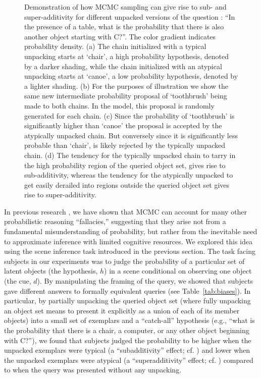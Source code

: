 \begin{figure}
\begin{center}
\caption{Demonstration of how MCMC sampling can give rise to sub- and super-additivity for different unpacked versions of the question : ``In the presence of a table, what is the probability that there is also another object starting with C?''. The color gradient indicates probability density. (a) The chain initialized with a typical unpacking starts at `chair', a high probability hypothesis, denoted by a darker shading, while the chain initialized with an atypical unpacking starts at `canoe', a low probability hypothesis, denoted by a lighter shading. 
(b) For the purposes of illustration we show the same new intermediate probability proposal of `toothbrush' being made to both chains. In the model, this proposal is randomly generated for each chain. %
(c) Since the probability of `toothbrush' is significantly higher than `canoe' the proposal is accepted by the atypically unpacked chain. But conversely since it is significantly less probable than `chair', is likely rejected by the typically unpacked chain.
(d) The tendency for the typically unpacked chain to tarry in the high probability region of the queried object set, gives rise to sub-additivity, whereas the tendency for the atypically unpacked to get easily derailed into regions outside the queried object set gives rise to super-additivity.}
\label{fig:demo}
\end{center}
\end{figure}

In previous research \citep{dasgupta2017hypotheses}, we have shown that MCMC can account for many other probabilistic reasoning ``fallacies,'' suggesting that they arise not from a fundamental misunderstanding of probability, but rather from the inevitable need to approximate inference with limited cognitive resources. We explored this idea using the scene inference task introduced in the previous section. The task facing subjects in our experiments was to judge the probability of a particular set of latent objects (the hypothesis, $h$) in a scene conditional on observing one object (the cue, $d$). By manipulating the framing of the query, we showed that subjects gave different answers to formally equivalent queries (see Table~\ref{tab:biases}). In particular, by partially unpacking the queried object set (where fully unpacking an object set means to present it explicitly as a union of each of its member objects) into a small set of exemplars and a ``catch-all'' hypothesis (e.g., ``what is the probability that there is a chair, a computer, or any other object beginning with C?''), we found that subjects judged the probability to be higher when the unpacked exemplars were typical (a ``subadditivity'' effect; cf. \citet{tversky94}) and lower when the unpacked exemplars were atypical (a ``superadditivity'' effect; cf. \citet{sloman04}) compared to when the query was presented without any unpacking.

